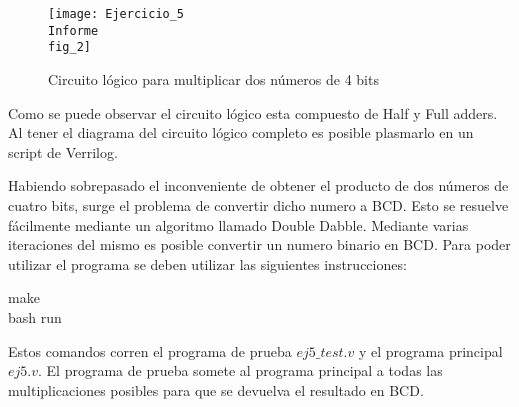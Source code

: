 \begin{figure}[h!]                                                       
    \centering
    \texttt{[image: Ejercicio\_5\\Informe\\fig\_2]}
     \caption{Circuito lógico para multiplicar dos números de 4 bits}
     \label{circuito_logico}
     \end{figure}



Como se puede observar el circuito lógico esta compuesto de Half y Full adders. Al tener el diagrama del circuito lógico completo es posible plasmarlo en un script de Verrilog.

Habiendo sobrepasado el inconveniente de obtener el producto de dos números de cuatro bits, surge el problema de convertir dicho numero a BCD. Esto se resuelve fácilmente mediante un algoritmo llamado Double Dabble. Mediante varias iteraciones del mismo es posible convertir un numero binario en BCD. Para poder utilizar el programa se deben utilizar las siguientes instrucciones: 

\begin{center}
    make\\
    bash run
\end{center}

Estos comandos corren el programa de prueba $ej5\_test.v$ y el programa principal $ej5.v$. 
El programa de prueba somete al programa principal a todas las multiplicaciones posibles para que se devuelva el resultado en BCD.
